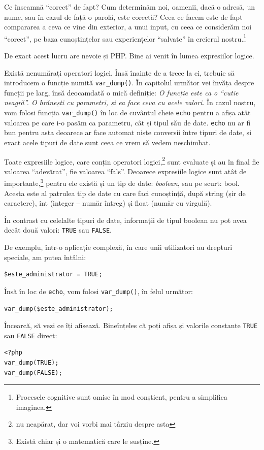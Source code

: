 Ce înseamnă ``corect'' de fapt? Cum determinăm noi, oamenii,
dacă o adresă, un nume, sau în cazul de față o parolă, este corectă?
Ceea ce facem este de fapt compararea a ceva ce vine din exterior, a
unui input, cu ceea ce considerăm noi ``corect'', pe baza cunoștințelor
sau experiențelor ``salvate'' în creierul nostru.\footnote{Procesele
cognitive sunt omise în mod conștient, pentru a simplifica imaginea.}

De exact acest lucru are nevoie și PHP. Bine ai venit în lumea
expresiilor logice. 

Există nenumărați operatori logici. Însă înainte de a trece
la ei, trebuie să introducem o funcție numită \texttt{var\_dump()}.
În capitolul următor vei învăța despre funcții pe larg,
însă deocamdată o mică definiție: \textit{O funcție este
ca o ``cutie neagră''. O hrănești cu parametri, și ea face ceva cu
acele valori}. În cazul nostru, vom folosi funcția \texttt{var\_dump()}
în loc de cuvântul cheie \texttt{echo} pentru a afișa atât valoarea
pe care i-o pasăm ca parametru, cât și tipul său de date. \texttt{echo}
nu ar fi bun pentru asta deoarece ar face automat niște conversii
între tipuri de date, și exact acele tipuri de date sunt ceea ce
vrem să vedem neschimbat.


Toate expresiile logice, care conțin operatori
logici,\footnote{nu neapărat, dar voi vorbi mai târziu
despre asta} sunt evaluate și au în final
fie valoarea ``adevărat'', fie valoarea ``fals''. Deoarece
expresiile logice sunt atât de importante,\footnote{Există
chiar și o matematică care le susține.}
pentru ele există și un tip de date: \textsl{boolean}, sau pe scurt: bool.
Acesta este al patrulea tip de date cu care faci cunoștință, după
string (șir de caractere), int (integer -- număr întreg)
și float (număr cu virgulă).

În contrast cu celelalte tipuri de date, informații de tipul
boolean nu pot avea decât două valori: \texttt{TRUE} sau \texttt{FALSE}.

De exemplu, într-o aplicație complexă, în care unii utilizatori
au drepturi speciale, am putea întâlni:
\begin{lstlisting}
$este_administrator = TRUE;
\end{lstlisting}
Însă în loc de \texttt{echo}, vom folosi \texttt{var\_dump()}, în felul următor:
\begin{lstlisting}[firstnumber=2]
var_dump($este_administrator);
\end{lstlisting}
Încearcă, să vezi ce îți afișează. Bineînțeles că poți afișa și valorile
constante \texttt{TRUE} sau \texttt{FALSE} direct:
\begin{lstlisting}
<?php
var_dump(TRUE);
var_dump(FALSE);
\end{lstlisting}

